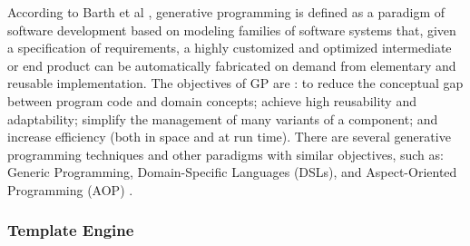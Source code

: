 
According to Barth et al \cite{barth2002}, generative programming is defined as a paradigm of software development based on modeling families of software systems that, given a specification of requirements, a highly customized and optimized intermediate or end product can be automatically fabricated on demand from elementary and reusable implementation. The objectives of GP are \cite{czarnecki1998}: to reduce the conceptual gap between program code and domain concepts; achieve high reusability and adaptability; simplify the management of many variants of a component; and increase efficiency (both in space and at run time). There are several generative programming techniques and other paradigms with similar objectives, such as: Generic Programming, Domain-Specific Languages (DSLs), and Aspect-Oriented Programming (AOP) \cite{czarnecki1998}.

\subsubsection{Template Engine}


